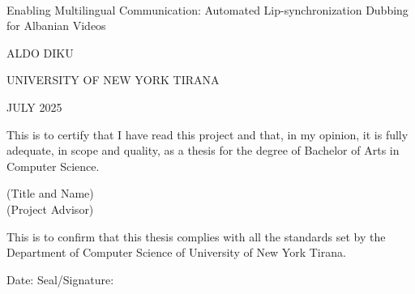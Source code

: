 \documentclass[12pt]{article}
\begin{document}
\begin{center}
    \mbox{}\\[2.0cm]
    \LARGE Enabling Multilingual Communication: Automated Lip-synchronization Dubbing for Albanian Videos
\end{center}

\vspace{10cm}

\begin{center}
    \Large ALDO DIKU
\end{center}

\vspace{5cm}

\begin{center}
    \Large UNIVERSITY OF NEW YORK TIRANA
\end{center}
\begin{center}
    \large \Large JULY 2025
\end{center}
\thispagestyle{empty}

\setcounter{page}{0}

\newpage
\noindent This is to certify that I have read this project and that, in my opinion, it is fully adequate, in scope and quality, as a thesis for the degree of Bachelor of Arts in Computer Science.

\vspace{4cm}

\noindent
(Title and Name) \hspace{4cm} \\
(Project Advisor) \hspace{2cm} \underline{\hspace{2cm}} \hspace{1cm} \underline{\hspace{8cm}}

\vspace{3cm}

\noindent This is to confirm that this thesis complies with all the standards set by the Department of Computer Science of University of New York Tirana.

\vspace{2cm}

\noindent Date: \hspace{5cm} \hfill Seal/Signature: \hspace{5cm}
\end{document}
